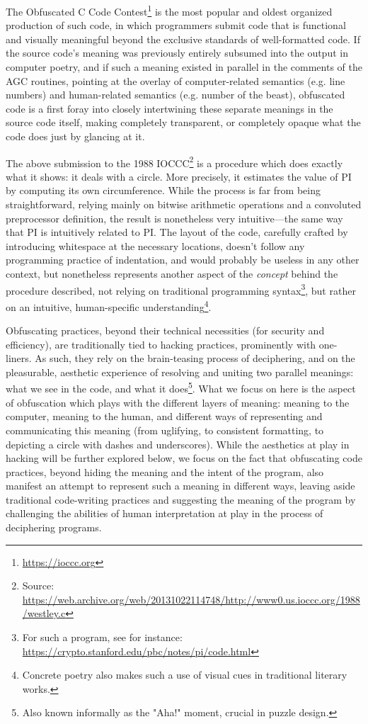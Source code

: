 \documentclass{article}
\begin{document}
The Obfuscated C Code Contest\footnote{\url{https://ioccc.org}} is the most popular and oldest organized production of such code, in which programmers submit code that is functional and visually meaningful beyond the exclusive standards of well-formatted code. If the source code's meaning was previously entirely subsumed into the output in computer poetry, and if such a meaning existed in parallel in the comments of the AGC routines, pointing at the overlay of computer-related semantics (e.g. line numbers) and human-related semantics (e.g. number of the beast), obfuscated code is a first foray into closely intertwining these separate meanings in the source code itself, making completely transparent, or completely opaque what the code does just by glancing at it.

\pagebreak



The above submission to the 1988 IOCCC\footnote{Source: \url{https://web.archive.org/web/20131022114748/http://www0.us.ioccc.org/1988/westley.c}} is a procedure which does exactly what it shows: it deals with a circle. More precisely, it estimates the value of PI by computing its own circumference. While the process is far from being straightforward, relying mainly on bitwise arithmetic operations and a convoluted preprocessor definition, the result is nonetheless very intuitive—the same way that PI is intuitively related to PI. The layout of the code, carefully crafted by introducing whitespace at the necessary locations, doesn't follow any programming practice of indentation, and would probably be useless in any other context, but nonetheless represents another aspect of the \emph{concept} behind the procedure described, not relying on traditional programming syntax\footnote{For such a program, see for instance: \url{https://crypto.stanford.edu/pbc/notes/pi/code.html}}, but rather on an intuitive, human-specific understanding\footnote{Concrete poetry also makes such a use of visual cues in traditional literary works.}.

Obfuscating practices, beyond their technical necessities (for security and efficiency), are traditionally tied to hacking practices, prominently with one-liners. As such, they rely on the brain-teasing process of deciphering, and on the pleasurable, aesthetic experience of resolving and uniting two parallel meanings: what we see in the code, and what it does\footnote{Also known informally as the "Aha!" moment, crucial in puzzle design.}. What we focus on here is the aspect of obfuscation which plays with the different layers of meaning: meaning to the computer, meaning to the human, and different ways of representing and communicating this meaning (from uglifying, to consistent formatting, to depicting a circle with dashes and underscores). While the aesthetics at play in hacking will be further explored below, we focus on the fact that obfuscating code practices, beyond hiding the meaning and the intent of the program, also manifest an attempt to represent such a meaning in different ways, leaving aside traditional code-writing practices and suggesting the meaning of the program by challenging the abilities of human interpretation at play in the process of deciphering programs.
\end{document}
